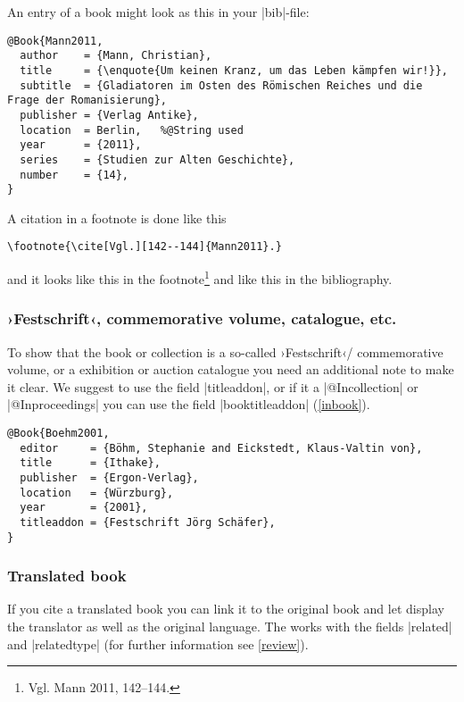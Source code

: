 \documentclass[a4paper,
10pt,
greek,
french,
spanish,
italian,
ngerman,
english
]{ltxdoc}
\begin{document}
 
An entry of a book might look as this in your |bib|-file:
\begin{lstlisting}[style=bibentry,label=Mann2011,caption={{@}Book\{Mann2011,…\} }]
@Book{Mann2011,
  author    = {Mann, Christian},
  title     = {\enquote{Um keinen Kranz, um das Leben kämpfen wir!}},
  subtitle  = {Gladiatoren im Osten des Römischen Reiches und die Frage der Romanisierung},
  publisher = {Verlag Antike},
  location  = Berlin, 	%@String used
  year      = {2011},
  series    = {Studien zur Alten Geschichte},
  number    = {14},
}
\end{lstlisting}
A citation in a footnote is done like this
\begin{lstlisting}
\footnote{\cite[Vgl.][142--144]{Mann2011}.}
\end{lstlisting} 
and it looks like this in the footnote\footnote{Vgl. Mann 2011, 142--144.}
and like this in the bibliography.

\subsubsection{›Festschrift‹, commemorative volume, catalogue, etc.}
To show that the book or collection is a so-called ›Festschrift‹/ commemorative volume, or a exhibition or auction catalogue you need an additional note to make it clear.
We suggest to use the field |titleaddon|, or if it a |@Incollection| or |@Inproceedings| you can use the field |booktitleaddon| (\cref{inbook}).
\begin{lstlisting}[style=bibentry,label=Boehm2001,caption={{@}Book\{Boehm2001,…\} }]
@Book{Boehm2001,
  editor     = {Böhm, Stephanie and Eickstedt, Klaus-Valtin von},
  title      = {Ithake},
  publisher  = {Ergon-Verlag},
  location   = {Würzburg},
  year       = {2001},
  titleaddon = {Festschrift Jörg Schäfer},
}
\end{lstlisting}

 
 \subsubsection{Translated book}
If you cite a translated book you can link it to the original book and let display the translator as well as the original language. 
The works with the fields |related| and |relatedtype| (for further information see \cref{review}).
\end{document}
